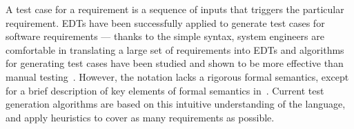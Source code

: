 A test case for a requirement is a sequence of inputs that triggers
the particular requirement. EDTs have been successfully applied to
generate test cases for software requirements --- thanks to the simple
syntax, system engineers are comfortable in translating a large set of
requirements into EDTs and algorithms for generating test cases have
been studied and shown to be more effective than manual
testing~\cite{Venkatesh:ENASE:2015}. However, the notation lacks a
rigorous formal semantics, except for a brief description of key
elements of formal semantics in~\cite{Venkatesh:DATE:2014}. Current
test generation algorithms are based on this intuitive understanding
of the language, and apply heuristics to cover as many requirements as
possible. 


%


